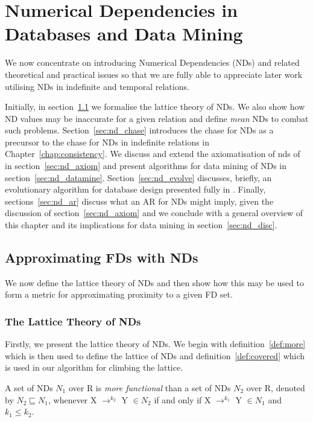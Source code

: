 \chapter{Numerical Dependencies in Databases and Data
Mining}\label{chap:numdep}

We now concentrate on introducing Numerical Dependencies (NDs) and
related theoretical and practical issues so that we are fully able to
appreciate later work utilising NDs in indefinite and temporal
relations.

\medskip

Initially, in section~\ref{sec:approx} we formalise the lattice theory
of NDs. We also show how ND values may be inaccurate for a given
relation and define {\em mean} NDs to combat such
problems. Section~\ref{sec:nd_chase} introduces the chase for NDs as a
precursor to the chase for NDs in indefinite relations in
Chapter~\ref{chap:consistency}. We discuss and extend the
axiomatisation of nds of \cite{gm85a} in section~\ref{sec:nd_axiom}
and present algorithms for data mining of NDs in
section~\ref{sec:nd_datamine}. Section~\ref{sec:nd_evolve} discusses,
briefly, an evolutionary algorithm for database design presented fully
in \cite{cl96}. Finally, sections~\ref{sec:nd_ar} discuss what an AR
for NDs might imply, given the discussion of
section~\ref{sec:nd_axiom} and we conclude with a general overview of
this chapter and its implications for data mining in section~\ref{sec:nd_disc}.


\section{Approximating FDs with NDs}\label{sec:approx}

We now define the lattice theory of NDs and then show how this may be
used to form a metric for approximating proximity to a given FD set. 

\subsection{The Lattice Theory of NDs}

Firstly, we present the lattice theory of NDs. We begin with
definition~\ref{def:more} which is then used to define the lattice of
NDs and definition~\ref{def:covered} which is used in our algorithm
for climbing the lattice.


\begin{definition}\label{def:more}
\begin{rm}
A set of NDs $N_1$ over R is {\em more functional} than a set of NDs 
$N_2$ over R, denoted by $N_2 \sqsubseteq N_1$, whenever
X $\to^{k_2}$ Y $\in N_2$ if and only if X $\to^{k_1}$ Y $\in N_1$ and 
$k_1 \le k_2$. 
\end{rm}
\end{definition}
\medskip

